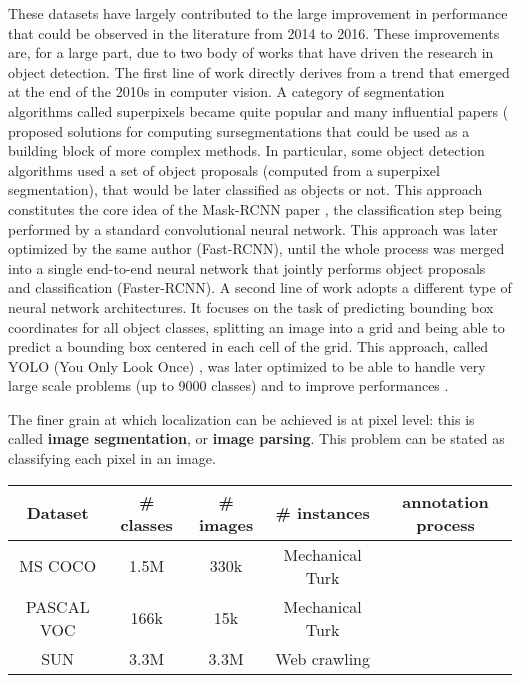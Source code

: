 These datasets have largely contributed to the large improvement in performance that could be observed in the literature from 2014 to 2016. These improvements are, for a large part, due to two body of works that have driven the research in object detection. The first line of work directly derives from a trend that emerged at the end of the 2010s in computer vision. A category of segmentation algorithms called superpixels became quite popular and many influential papers (\cite{felzenszwalb2004efficient, achanta2012slic, levinshtein2009turbopixels} proposed solutions for computing sursegmentations that could be used as a building block of more complex methods. In particular, some object detection algorithms used a set of object proposals \cite{uijlings2013selective} (computed from a superpixel segmentation), that would be later classified as objects or not. This approach constitutes the core idea of the Mask-RCNN paper \cite{girshick2014maskrcnn}, the classification step being performed by a standard convolutional neural network. This approach was later optimized by the same author \cite{girshick2014fastrcnn} (Fast-RCNN), until the whole process was merged into a single end-to-end neural network that jointly performs object proposals and classification \cite{ren2015faster} (Faster-RCNN). A second line of work adopts a different type of neural network architectures. It focuses on the task of predicting bounding box coordinates for all object classes, splitting an image into a grid and being able to predict a bounding box centered in each cell of the grid. This approach, called YOLO (You Only Look Once) \cite{redmon2016you}, was later optimized to be able to handle very large scale problems \cite{redmon2017yolo9000} (up to 9000 classes) and to improve performances \cite{redmon2018yolov3}. 



The finer grain at which localization can be achieved is at pixel level: this is called \textbf{image segmentation}, or \textbf{image parsing}. This problem can be stated as classifying each pixel in an image.

\vspace{0.5cm}

\begin{center}
	\begin{tabular}{|c|c|c|c|c|}
		\hline
		Dataset & \# classes & \# images & \# instances & annotation process \\
		\hline
		MS COCO \cite{chen2015microsoft} & 1.5M & 330k & Mechanical Turk \\
		PASCAL VOC \cite{} & 166k & 15k & Mechanical Turk \\
		SUN \cite{} & 3.3M & 3.3M & Web crawling \\
		\hline
	\end{tabular}
\end{center}
\vspace{0.5cm}

